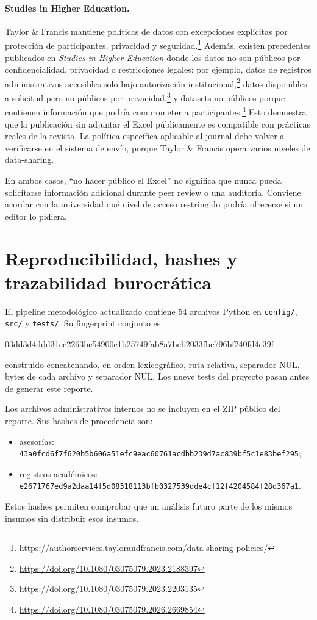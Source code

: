 \documentclass[11pt,letterpaper]{article}
\newcommand{\code}[1]{\texttt{#1}}
\begin{document}
\paragraph{Studies in Higher Education.} Taylor \& Francis mantiene políticas de datos con excepciones explícitas por protección de participantes, privacidad y seguridad.\footnote{\url{https://authorservices.taylorandfrancis.com/data-sharing-policies/}} Además, existen precedentes publicados en \emph{Studies in Higher Education} donde los datos no son públicos por confidencialidad, privacidad o restricciones legales: por ejemplo, datos de registros administrativos accesibles solo bajo autorización institucional,\footnote{\url{https://doi.org/10.1080/03075079.2023.2188397}} datos disponibles a solicitud pero no públicos por privacidad,\footnote{\url{https://doi.org/10.1080/03075079.2023.2203135}} y datasets no públicos porque contienen información que podría comprometer a participantes.\footnote{\url{https://doi.org/10.1080/03075079.2026.2669854}} Esto demuestra que la publicación sin adjuntar el Excel públicamente es compatible con prácticas reales de la revista. La política específica aplicable al journal debe volver a verificarse en el sistema de envío, porque Taylor \& Francis opera varios niveles de data-sharing.

En ambos casos, ``no hacer público el Excel'' no significa que nunca pueda solicitarse información adicional durante peer review o una auditoría. Conviene acordar con la universidad qué nivel de acceso restringido podría ofrecerse si un editor lo pidiera.

\section{Reproducibilidad, hashes y trazabilidad burocrática}

El pipeline metodológico actualizado contiene 54 archivos Python en \code{config/}, \code{src/} y \code{tests/}. Su fingerprint conjunto es
\begin{center}
\small\ttfamily 03dd3d4ddd31cc2263be54900e1b25749fab8a7beb2033fbe796bf240fd4c39f
\end{center}
construido concatenando, en orden lexicográfico, ruta relativa, separador NUL, bytes de cada archivo y separador NUL. Los nueve tests del proyecto pasan antes de generar este reporte.

Los archivos administrativos internos no se incluyen en el ZIP público del reporte. Sus hashes de procedencia son:
\begin{itemize}[leftmargin=*]
\item asesorías: \code{43a0fcd6f7f620b5b606a51efc9eac60761acdbb239d7ac839bf5c1e83bef295};
\item registros académicos: \code{e2671767ed9a2daa14f5d08318113bfb0327539dde4cf12f4204584f28d367a1}.
\end{itemize}
Estos hashes permiten comprobar que un análisis futuro parte de los mismos insumos sin distribuir esos insumos.
\end{document}
